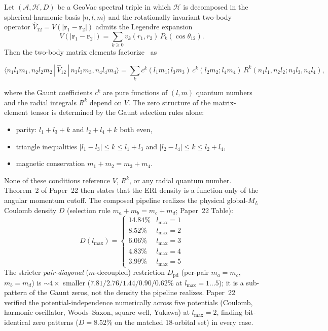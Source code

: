 \documentclass[twocolumn,pra,amsmath,amssymb,superscriptaddress]{revtex4-2}
\begin{document}
Let $(\mathcal{A}, \mathcal{H}, D)$ be a GeoVac spectral triple in
which $\mathcal{H}$ is decomposed in the spherical-harmonic basis
$|n, l, m\rangle$ and the rotationally invariant two-body operator
$\hat{V}_{12} = V(|\mathbf{r}_1 - \mathbf{r}_2|)$ admits the Legendre
expansion
\[
  V(|\mathbf{r}_1 - \mathbf{r}_2|)
  = \sum_{k \ge 0} v_k(r_1, r_2)\, P_k(\cos\theta_{12}).
\]
Then the two-body matrix elements factorize~\cite{paper22} as
\begin{widetext}
\[
  \langle n_1 l_1 m_1, n_2 l_2 m_2\,|\,\hat{V}_{12}\,|
  \,n_3 l_3 m_3, n_4 l_4 m_4 \rangle
  = \sum_k c^k(l_1 m_1; l_3 m_3)\, c^k(l_2 m_2; l_4 m_4)\,
  R^k(n_1 l_1, n_2 l_2; n_3 l_3, n_4 l_4),
\]
\end{widetext}
where the Gaunt coefficients $c^k$ are pure functions of $(l, m)$
quantum numbers and the radial integrals $R^k$ depend on $V$.  The
zero structure of the matrix-element tensor is determined by the
Gaunt selection rules alone:
\begin{itemize}
\item parity: $l_1 + l_3 + k$ and $l_2 + l_4 + k$ both even,
\item triangle inequalities $|l_1 - l_3| \le k \le l_1 + l_3$ and
  $|l_2 - l_4| \le k \le l_2 + l_4$,
\item magnetic conservation $m_1 + m_2 = m_3 + m_4$.
\end{itemize}
None of these conditions reference $V$, $R^k$, or any radial quantum
number.  Theorem~2 of Paper~22 then states that the ERI density is a function
only of the angular momentum cutoff.  The composed pipeline realizes the
physical global-$M_L$ Coulomb density $D$ (selection rule
$m_a+m_b=m_c+m_d$; Paper~22 Table):
\begin{equation}
  D(l_{\max}) =
  \begin{cases}
    14.84\% & l_{\max} = 1 \\
    8.52\% & l_{\max} = 2 \\
    6.06\% & l_{\max} = 3 \\
    4.83\% & l_{\max} = 4 \\
    3.99\% & l_{\max} = 5
  \end{cases}
  \label{eq:eri_density}
\end{equation}
The stricter \emph{pair-diagonal} ($m$-decoupled) restriction
$D_{\mathrm{pd}}$ (per-pair $m_a=m_c$, $m_b=m_d$) is $\sim\!4\times$
smaller ($7.81/2.76/1.44/0.90/0.62\%$ at $l_{\max}=1\ldots5$); it is a
sub-pattern of the Gaunt zeros, not the density the pipeline realizes.
Paper~22 verified the potential-independence numerically across five
potentials (Coulomb, harmonic oscillator, Woods--Saxon, square well,
Yukawa) at $l_{\max} = 2$, finding bit-identical zero patterns
($D = 8.52\%$ on the matched 18-orbital set) in every case.
\end{document}

